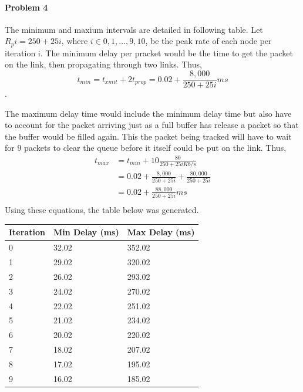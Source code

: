 \documentclass[12pt]{article}
\begin{document}
\paragraph{Problem 4}
The minimum and maxium intervals are detailed in following table. Let $R_pi  = 250 + 25i$, where $i\in {0, 1, ..., 9, 10}$, be the peak rate of each node per iteration i. The minimum delay per pracket would be the time to get the packet on the link, then propagating through two links. Thus, \\
$$t_{min} = t_{xmit} + 2t_{prop} = 0.02 + \frac{ 8,000 }{ 250 + 25i } ms$$.

The maximum delay time would include the minimum delay time but also have to account for the packet arriving just as a full buffer has release a packet so that the buffer would be filled again. This the packet being tracked will have to wait for 9 packets to clear the queue before it itself could be put on the link. Thus, \\
\begin{align}
t_{max} & = t_{min} + 10\frac{ 80 }{ 250 + 25i Kb/s }\\
& = 0.02 + \frac{ 8,000 }{ 250 + 25i } + \frac{ 80,000 }{ 250 + 25i } \\
& = 0.02 + \frac{ 88,000 }{ 250 + 25i } ms\\
\end{align}
Using these equations, the table below was generated. 

\begin{center}
	\begin{tabular}{ | l | l | l | }
	\hline
	Iteration & Min Delay (ms) & Max Delay (ms)\\ \hline
	0 & 32.02 & 352.02 \\ \hline                                                                                             
	1 & 29.02 & 320.02 \\ \hline                                                                                             
	2 & 26.02 & 293.02 \\ \hline                                                                                             
	3 & 24.02 & 270.02 \\ \hline                                                                                             
	4 & 22.02 & 251.02 \\ \hline                                                                                             
	5 & 21.02 & 234.02 \\ \hline                                                                                             
	6 & 20.02 & 220.02 \\ \hline                                                                                             
	7 & 18.02 & 207.02 \\ \hline                                                                                             
	8 & 17.02 & 195.02 \\ \hline                                                                                             
	9 & 16.02 & 185.02 \\ \hline
	\end{tabular}
\end{center}
\end{document}
